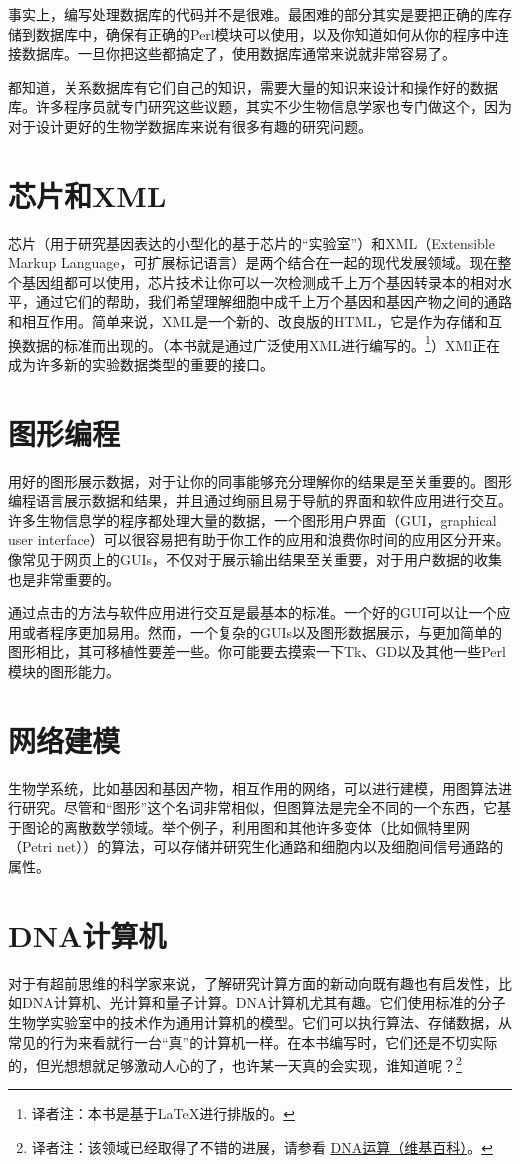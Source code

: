 事实上，编写处理数据库的代码并不是很难。最困难的部分其实是要把正确的库存储到数据库中，确保有正确的Perl模块可以使用，以及你知道如何从你的程序中连接数据库。一旦你把这些都搞定了，使用数据库通常来说就非常容易了。

都知道，关系数据库有它们自己的知识，需要大量的知识来设计和操作好的数据库。许多程序员就专门研究这些议题，其实不少生物信息学家也专门做这个，因为对于设计更好的生物学数据库来说有很多有趣的研究问题。

\section{芯片和XML}
芯片（用于研究基因表达的小型化的基于芯片的“实验室”）和XML（Extensible Markup Language，可扩展标记语言）是两个结合在一起的现代发展领域。现在整个基因组都可以使用，芯片技术让你可以一次检测成千上万个基因转录本的相对水平，通过它们的帮助，我们希望理解细胞中成千上万个基因和基因产物之间的通路和相互作用。简单来说，XML是一个新的、改良版的HTML，它是作为存储和互换数据的标准而出现的。（本书就是通过广泛使用XML进行编写的。\footnote{译者注：本书是基于\LaTeX 进行排版的。}）XMl正在成为许多新的实验数据类型的重要的接口。

\section{图形编程}
用好的图形展示数据，对于让你的同事能够充分理解你的结果是至关重要的。图形编程语言展示数据和结果，并且通过绚丽且易于导航的界面和软件应用进行交互。许多生物信息学的程序都处理大量的数据，一个图形用户界面（GUI，graphical user interface）可以很容易把有助于你工作的应用和浪费你时间的应用区分开来。像常见于网页上的GUIs，不仅对于展示输出结果至关重要，对于用户数据的收集也是非常重要的。

通过点击的方法与软件应用进行交互是最基本的标准。一个好的GUI可以让一个应用或者程序更加易用。然而，一个复杂的GUIs以及图形数据展示，与更加简单的图形相比，其可移植性要差一些。你可能要去摸索一下Tk、GD以及其他一些Perl模块的图形能力。

\section{网络建模}
生物学系统，比如基因和基因产物，相互作用的网络，可以进行建模，用图算法进行研究。尽管和“图形”这个名词非常相似，但图算法是完全不同的一个东西，它基于图论的离散数学领域。举个例子，利用图和其他许多变体（比如佩特里网（Petri net））的算法，可以存储并研究生化通路和细胞内以及细胞间信号通路的属性。

\section{DNA计算机}
对于有超前思维的科学家来说，了解研究计算方面的新动向既有趣也有启发性，比如DNA计算机、光计算和量子计算。DNA计算机尤其有趣。它们使用标准的分子生物学实验室中的技术作为通用计算机的模型。它们可以执行算法、存储数据，从常见的行为来看就行一台“真”的计算机一样。在本书编写时，它们还是不切实际的，但光想想就足够激动人心的了，也许某一天真的会实现，谁知道呢？\footnote{译者注：该领域已经取得了不错的进展，请参看 \href{https://zh.wikipedia.org/wiki/DNA\%E9\%81\%8B\%E7\%AE\%97}{DNA运算（维基百科）}。}
